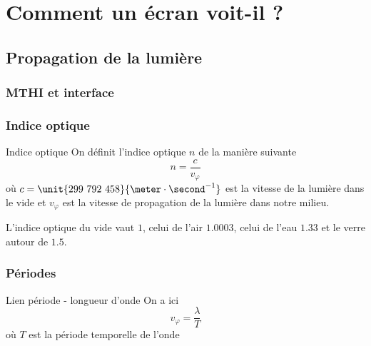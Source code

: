 \documentclass{beamercours}
\begin{document}
\section{Comment un écran voit-il ?}
\subsection{Propagation de la lumière}

\begin{frame}
	\frametitle{MTHI et interface}
\end{frame}

\begin{frame}
\frametitle{Indice optique}
\begin{définition}{Indice optique}{}
On définit l'indice optique $n$ de la manière suivante
\begin{equation*}
	n=\frac{c}{v_\varphi}
\end{equation*}
où $c =\unit{299~792~458}{\meter\cdot\second^{-1}}$ est la vitesse de la lumière dans le vide et $v_\varphi$ est la vitesse de propagation de la lumière dans notre milieu.
\end{définition}
L'indice optique du vide vaut $1$, celui de l'air $1.0003$, celui de l'eau $1.33$ et le verre autour de $1.5$.
\end{frame}

\begin{frame}
\frametitle{Périodes}
\begin{remarque}{Lien période - longueur d'onde}{}
	On a ici
	\begin{equation*}
		v_\varphi = \frac{\lambda}{T}
	\end{equation*}
	où $T$ est la période temporelle de l'onde
\end{remarque}
\end{frame}
\end{document}
